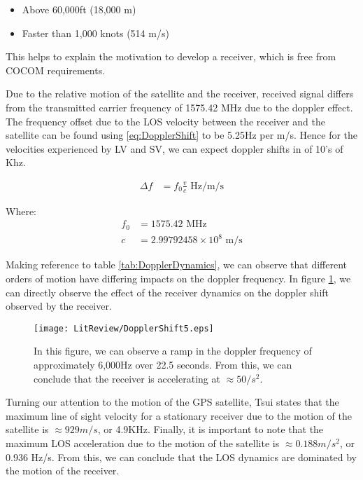 \begin{itemize}
\item{Above 60,000ft (18,000 m)}
\item{Faster than 1,000 knots (514 m/s) }
\end{itemize}

This helps to explain the motivation to develop a receiver, which is free from \ac{COCOM} requirements.

Due to the relative motion of the satellite and the receiver, received signal differs from the transmitted carrier frequency of 1575.42 MHz due to the doppler effect\cite{Tsui}. The frequency offset due to the \ac{LOS} velocity between the receiver and the satellite can be found using \ref{eq:DopplerShift} to be 5.25Hz per m/s. Hence for the velocities experienced by \ac{LV} and \ac{SV}, we can expect doppler shifts in of 10's of Khz.

\begin{align}
\Delta f &= f_0\frac{v}{c} \text{ Hz/m/s}
\label{eq:DopplerShift}
\end{align}

Where: 
\begin{align*}
f_0 &= 1575.42 \text{ MHz}\\   
c &= 2.99792458 \times 10^8 \text{ m/s}
\end{align*}


Making reference to table \ref{tab:DopplerDynamics}, we can observe that different orders of motion have differing impacts on the doppler frequency. In figure \ref{fig:DopplerShift}, we can directly observe the effect of the receiver dynamics on the doppler shift observed by the receiver.

\begin{figure}[!htb] 
    \centering
    \texttt{[image: LitReview/DopplerShift5.eps]} 
    \caption{In this figure, we can observe a ramp in the doppler frequency of approximately 6,000Hz over 22.5 seconds. From this, we can conclude that the receiver is accelerating at $\approx50/s^2$.}
    \label{fig:DopplerShift}
\end{figure}



Turning our attention to the motion of the GPS satellite, Tsui states that the maximum line of sight velocity for a stationary receiver due to the motion of the satellite is $\approx 929 m/s$, or 4.9KHz. Finally, it is important to note that the maximum \ac{LOS} acceleration due to the motion of the satellite is $\approx 0.188m/s^2$, or 0.936 Hz/s\cite{Tsui}. From this, we can conclude that the \ac{LOS} dynamics are dominated by the motion of the receiver.

